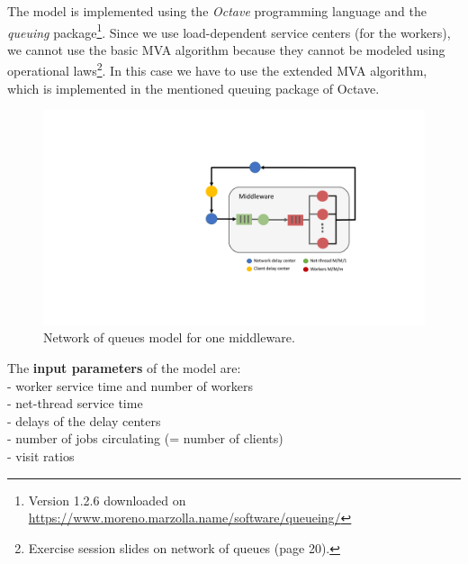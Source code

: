 The model is implemented using the \textit{Octave} programming language and the \textit{queuing} package\footnote{Version 1.2.6 downloaded on \url{https://www.moreno.marzolla.name/software/queueing/}}.
Since we use load-dependent service centers (for the workers), we cannot use the basic MVA algorithm because they cannot be modeled using operational laws\footnote{Exercise session slides on network of queues (page 20).}. In this case we have to use the extended MVA algorithm, which is implemented in the mentioned queuing package of Octave.

\begin{figure}[!ht]
    \centering
	\includegraphics[scale=0.6]{figures/6_NoQ/NoQ_figure_one_mw.pdf}
	\caption{Network of queues model for one middleware.}
	\label{NoQ_one_mw}
\end{figure}

The \textbf{input parameters} of the model are: \\
- worker service time and number of workers \\
- net-thread service time \\
- delays of the delay centers \\
- number of jobs circulating (= number of clients) \\
- visit ratios \\

